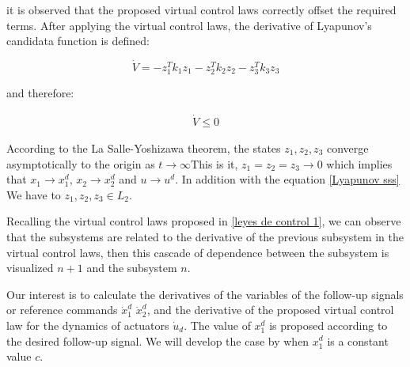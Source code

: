 it is observed that the proposed virtual control laws correctly offset the required terms. After applying the virtual control laws, the derivative of Lyapunov’s candidata function is defined: 

\begin{equation}
\label{Lyapunov sss}
    \dot V = - z^T_1 k_1 z_1 - z^T_2 k_2 z_2 -  z^T_3  k_3 z_3
\end{equation}

and therefore: 

\begin{gather}
    \dot V \leqslant 0
\end{gather}

According to the La Salle-Yoshizawa theorem, the states $z_1,z_2,z_3$ converge asymptotically to the origin as  $t\to\infty$This is it, $z_1=z_2 = z_3 \to 0$ which implies that $x_1\to x_1^d$, $x_2\to x_2^d$ and $u\to u^d$. In addition with the equation \ref{Lyapunov sss} We have to $z_1, z_2, z_3 \in L_2$. 




\medskip

Recalling the virtual control laws proposed in \ref{leyes de control 1}, we can observe that the subsystems are related to the derivative of the previous subsystem in the virtual control laws, then this cascade of dependence between the subsystem is visualized $n+1$ and the subsystem $n$.

Our interest is to calculate the derivatives of the variables of the follow-up signals or reference commands $\dot x_1^d$ $\dot x_2^d$, and the derivative of the proposed virtual control law for the dynamics of actuators $\dot u_d$. The value of $x_1^d$ is proposed according to the desired follow-up signal. We will develop the case by when $x_1^d$ is a constant value $c$.

